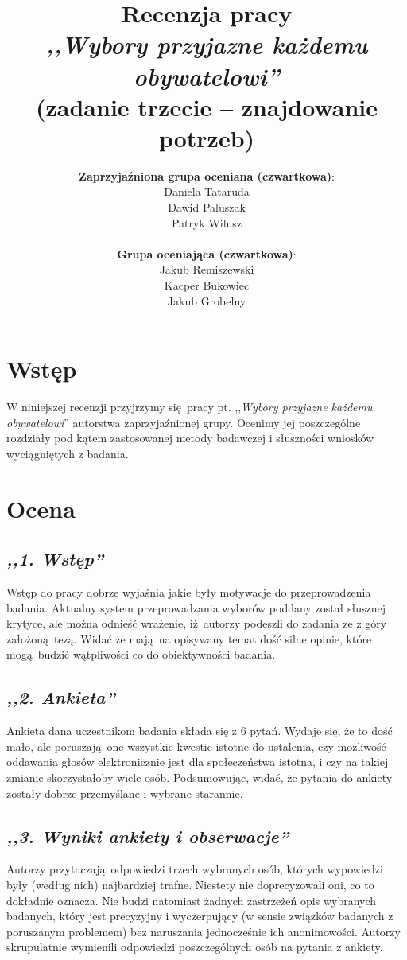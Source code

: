 \documentclass[12pt, a4paper, oneside]{article}
\title{Recenzja pracy\\ \textit{,,Wybory przyjazne każdemu obywatelowi''}\\
       \large(zadanie trzecie -- znajdowanie potrzeb)}
\date{}
\author{
    \textbf{Zaprzyjaźniona grupa oceniana \small(czwartkowa)}:
        \\ Daniela Tataruda
        \\ Dawid Paluszak
        \\ Patryk Wilusz\\
    \\\textbf{Grupa oceniająca \small(czwartkowa)}:
        \\ Jakub Remiszewski
        \\ Kacper Bukowiec
        \\ Jakub Grobelny
}
\begin{document}
\begin{titlepage}
    \maketitle
\end{titlepage}

\section*{Wstęp}

W niniejszej recenzji przyjrzymy się pracy pt. ,,\textit{Wybory przyjazne 
każdemu obywatelowi}'' autorstwa zaprzyjaźnionej grupy. Ocenimy jej 
poszczególne rozdziały pod kątem zastosowanej metody badawczej i słuszności 
wniosków wyciągniętych z badania. 

\section*{Ocena}

\subsection*{\textit{,,1. Wstęp''}}

Wstęp do pracy dobrze wyjaśnia jakie były motywacje do przeprowadzenia badania. 
Aktualny system przeprowadzania wyborów poddany został słusznej krytyce, ale 
można odnieść wrażenie, iż autorzy podeszli do zadania ze z góry założoną tezą. 
Widać że mają na opisywany temat dość silne opinie, które mogą budzić 
wątpliwości co do obiektywności badania.

\subsection*{\textit{,,2. Ankieta''}}

Ankieta dana uczestnikom badania składa się z 6 pytań. Wydaje się, że to dość 
mało, ale poruszają one wszystkie kwestie istotne do ustalenia, czy możliwość 
oddawania głosów elektronicznie jest dla społeczeństwa istotna, i czy na takiej 
zmianie skorzystałoby wiele osób. Podsumowując, widać, że pytania do ankiety zostały dobrze przemyślane i wybrane starannie.

\subsection*{\textit{,,3. Wyniki ankiety i obserwacje''}}

Autorzy przytaczają odpowiedzi trzech wybranych osób, których wypowiedzi były 
(według nich) najbardziej trafne. Niestety nie doprecyzowali oni, co to 
dokładnie oznacza. Nie budzi natomiast żadnych zastrzeżeń opis wybranych 
badanych, który jest precyzyjny i wyczerpujący (w sensie związków badanych z poruszanym problemem) bez naruszania jednocześnie ich anonimowości. 
Autorzy skrupulatnie wymienili odpowiedzi poszczególnych osób na pytania z 
ankiety.
\end{document}

